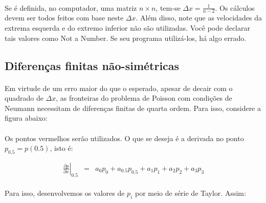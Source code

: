 \documentclass[introducao.tex]{subfiles}
\begin{document}
\paragraph{} Se é definida, no computador, uma matriz $n\times n$, tem-se $\Delta x = \frac{1}{n-2}$. Os cálculos devem ser todos feitos com base neste $\Delta x$. Além disso, note que as velocidades da extrema esquerda e do extremo inferior não são utilizadas. Você pode declarar tais valores como Not a Number. Se seu programa utilizá-los, há algo errado.

\domainOne

\subsection{Diferenças finitas não-simétricas}

\paragraph{} Em virtude de um erro maior do que o esperado, apesar de decair com o quadrado de $\Delta x$, as fronteiras do problema de Poisson com condições de Neumann necessitam de diferenças finitas de quarta ordem. Para isso, considere a figura abaixo:

\nonsymmetricright

\paragraph{} Os pontos vermelhos serão utilizados. O que se deseja é a derivada no ponto $p_{0.5} = p(0.5)$, isto é:

\begin{eqnarray}
\left.\frac{\partial p}{\partial x}\right|_{0.5} & = & a_0 p_0 + a_{0.5} p_{0.5} + a_1 p_1 + a_2 p_2 + a_3 p_3\label{combinationNonSymmetric}
\end{eqnarray}

\paragraph{} Para isso, desenvolvemos os valores de $p_i$ por meio de série de Taylor. Assim:
\end{document}
